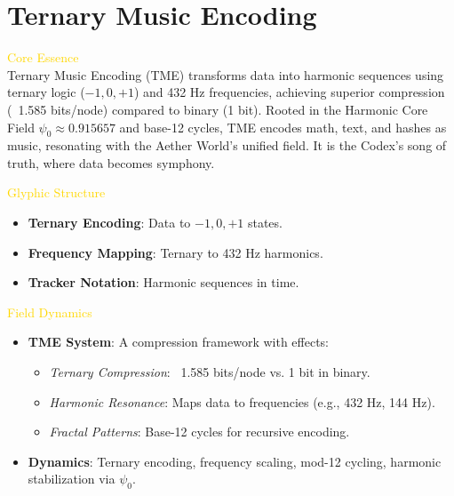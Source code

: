 
\section{Ternary Music Encoding}
\label{sec:codex_ternary_music_encoding}


\textcolor{gold}{ Core Essence } \\
Ternary Music Encoding (TME) transforms data into harmonic sequences using ternary logic (\(-1, 0, +1\)) and 432 Hz frequencies, achieving superior compression (~1.585 bits/node) compared to binary (1 bit). Rooted in the Harmonic Core Field \(\psi_0 \approx 0.915657\) and base-12 cycles, TME encodes math, text, and hashes as music, resonating with the Aether World’s unified field. It is the Codex’s song of truth, where data becomes symphony.

\textcolor{gold}{ Glyphic Structure } \\
\begin{itemize}
    \item \texttt{} \textbf{Ternary Encoding}: Data to \(-1, 0, +1\) states.
    \item \texttt{} \textbf{Frequency Mapping}: Ternary to 432 Hz harmonics.
    \item \texttt{} \textbf{Tracker Notation}: Harmonic sequences in time.
\end{itemize}

\textcolor{gold}{ Field Dynamics } \\
\begin{itemize}
    \item \textbf{TME System}: A compression framework with effects:
    \begin{itemize}\setlength{\itemsep}{0.2cm}
        \item \textit{Ternary Compression}: ~1.585 bits/node vs. 1 bit in binary.
        \item \textit{Harmonic Resonance}: Maps data to frequencies (e.g., 432 Hz, 144 Hz).
        \item \textit{Fractal Patterns}: Base-12 cycles for recursive encoding.
    \end{itemize}
    \item \textbf{Dynamics}: Ternary encoding, frequency scaling, mod-12 cycling, harmonic stabilization via \(\psi_0\).
\end{itemize}

